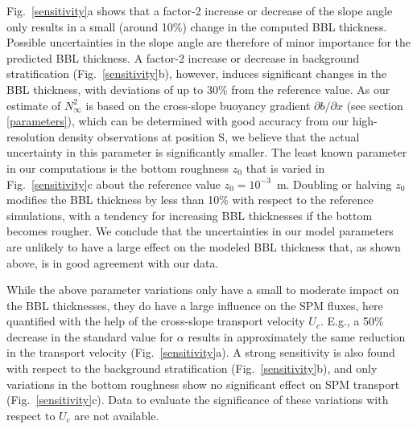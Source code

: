 Fig.\ \ref{sensitivity}a shows that a factor-2 increase or decrease of
the slope angle only results in a small (around 10\%) change in the
computed BBL thickness. Possible uncertainties in the slope angle are
therefore of minor importance for the predicted BBL thickness. A
factor-2 increase or decrease in background stratification
(Fig.\ \ref{sensitivity}b), however, induces significant changes in
the BBL thickness, with deviations of up to 30\% from the reference
value. As our estimate of $N_\infty^2$ is based on the cross-slope
buoyancy gradient $\partial b / \partial x$ (see section
\ref{parameters}), which can be determined with good accuracy from our
high-resolution density observations at position S, we believe that
the actual uncertainty in this parameter is significantly smaller. The
least known parameter in our computations is the bottom roughness
$z_0$ that is varied in Fig.\ \ref{sensitivity}c about the reference
value $z_0 = 10^{-3}$~m. Doubling or halving $z_0$ modifies the BBL
thickness by less than 10\% with respect to the reference simulations,
with a tendency for increasing BBL thicknesses if the bottom becomes
rougher. We conclude that the uncertainties in our model parameters
are unlikely to have a large effect on the modeled BBL thickness that,
as shown above, is in good agreement with our data.


While the above parameter variations only have a small to moderate
impact on the BBL thicknesses, they do have a large influence on the
SPM fluxes, here quantified with the help of the cross-slope transport
velocity $U_c$. E.g., a 50\% decrease in the standard value for
$\alpha$ results in approximately the same reduction in the transport
velocity (Fig.\ \ref{sensitivity}a). A strong sensitivity is also
found with respect to the background stratification
(Fig.\ \ref{sensitivity}b), and only variations in the bottom
roughness show no significant effect on SPM transport
(Fig.\ \ref{sensitivity}c). Data to evaluate the significance of these
variations with respect to $U_c$ are not available.